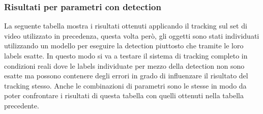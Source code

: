 \subsubsection{Risultati per parametri con detection}
La seguente tabella mostra i risultati ottenuti applicando il tracking sul set di video utilizzato in precedenza, questa volta però, gli oggetti sono stati individuati utilizzando un modello per eseguire la detection piuttosto che tramite le loro labels esatte. In questo modo si va a testare il sistema di tracking completo in condizioni reali dove le labels individuate per mezzo della detection non sono esatte ma possono contenere degli errori in grado di influenzare il risultato del tracking stesso. Anche le combinazioni di parametri sono le stesse in modo da poter confrontare i risultati di questa tabella con quelli ottenuti nella tabella precedente.
